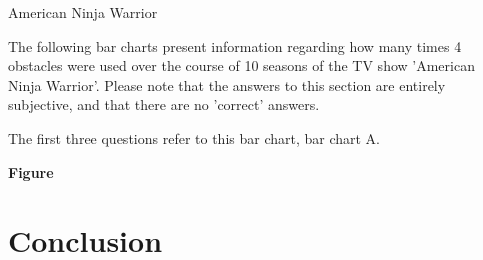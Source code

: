American Ninja Warrior\newline

The following bar charts present information regarding how many times 4 obstacles were used over the course of 10 seasons of the TV show 'American Ninja Warrior'. Please note that the answers to this section are entirely subjective, and that there are no 'correct' answers.\newline


The first three questions refer to this bar chart, bar chart A.

\textbf{Figure}












\section{Conclusion}
